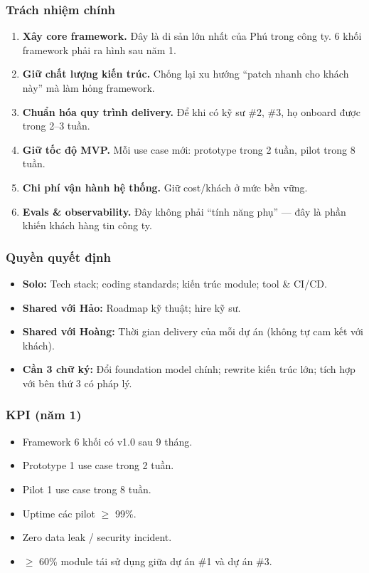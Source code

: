\documentclass[11pt,a4paper]{article}
\begin{document}
\subsubsection*{Trách nhiệm chính}
\begin{enumerate}
\item \textbf{Xây core framework.} Đây là di sản lớn nhất của Phú trong công ty.
6 khối framework phải ra hình sau năm 1.
\item \textbf{Giữ chất lượng kiến trúc.} Chống lại xu hướng ``patch nhanh cho
khách này'' mà làm hỏng framework.
\item \textbf{Chuẩn hóa quy trình delivery.} Để khi có kỹ sư \#2, \#3, họ onboard
được trong 2--3 tuần.
\item \textbf{Giữ tốc độ MVP.} Mỗi use case mới: prototype trong 2 tuần, pilot
trong 8 tuần.
\item \textbf{Chi phí vận hành hệ thống.} Giữ cost/khách ở mức bền vững.
\item \textbf{Evals \& observability.} Đây không phải ``tính năng phụ'' --- đây
là phần khiến khách hàng tin công ty.
\end{enumerate}

\subsubsection*{Quyền quyết định}
\begin{itemize}
\item \textbf{Solo:} Tech stack; coding standards; kiến trúc module; tool \& CI/CD.
\item \textbf{Shared với Hảo:} Roadmap kỹ thuật; hire kỹ sư.
\item \textbf{Shared với Hoàng:} Thời gian delivery của mỗi dự án (không tự cam kết với khách).
\item \textbf{Cần 3 chữ ký:} Đổi foundation model chính; rewrite kiến trúc lớn; tích hợp với bên thứ 3 có pháp lý.
\end{itemize}

\subsubsection*{KPI (năm 1)}
\begin{itemize}
\item Framework 6 khối có v1.0 sau 9 tháng.
\item Prototype 1 use case trong 2 tuần.
\item Pilot 1 use case trong 8 tuần.
\item Uptime các pilot $\geq$ 99\%.
\item Zero data leak / security incident.
\item $\geq$ 60\% module tái sử dụng giữa dự án \#1 và dự án \#3.
\end{itemize}
\end{document}
